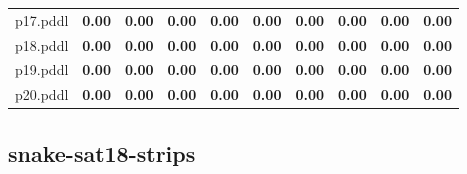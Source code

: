 \documentclass{article}
\begin{document}
\begin{tabular}{@{}lrrrrrrrrr@{}}
p17.pddl & \textbf{0.00} & \textbf{0.00} & \textbf{0.00} & \textbf{0.00} & \textbf{0.00} & \textbf{0.00} & \textbf{0.00} & \textbf{0.00} & \textbf{0.00} \\
p18.pddl & \textbf{0.00} & \textbf{0.00} & \textbf{0.00} & \textbf{0.00} & \textbf{0.00} & \textbf{0.00} & \textbf{0.00} & \textbf{0.00} & \textbf{0.00} \\
p19.pddl & \textbf{0.00} & \textbf{0.00} & \textbf{0.00} & \textbf{0.00} & \textbf{0.00} & \textbf{0.00} & \textbf{0.00} & \textbf{0.00} & \textbf{0.00} \\
p20.pddl & \textbf{0.00} & \textbf{0.00} & \textbf{0.00} & \textbf{0.00} & \textbf{0.00} & \textbf{0.00} & \textbf{0.00} & \textbf{0.00} & \textbf{0.00} \\
\end{tabular}

\hypertarget{quality-snake-sat18-strips}{}
\subsection*{snake-sat18-strips}
\end{document}
